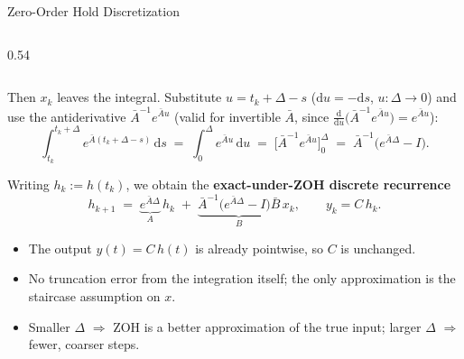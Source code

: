 \begin{frame}{Zero-Order Hold Discretization}
\begin{columns}[T]
\begin{column}{0.54\textwidth}
    \end{column}
  \end{columns}

  Then $x_k$ leaves the integral. Substitute $u = t_k + \Delta - s$ ($\mathrm{d}u = -\mathrm{d}s$, $u\colon \Delta \to 0$) and use the antiderivative $\bar{A}^{-1} e^{\bar{A} u}$ (valid for invertible $\bar{A}$, since $\tfrac{\mathrm{d}}{\mathrm{d}u}\bigl(\bar{A}^{-1} e^{\bar{A} u}\bigr) = e^{\bar{A} u}$):
  \[
    \int_{t_k}^{t_k+\Delta} e^{\bar{A}(t_k+\Delta-s)}\,\mathrm{d}s
    \;=\; \int_0^{\Delta} e^{\bar{A} u}\,\mathrm{d}u
    \;=\; \bigl[\bar{A}^{-1} e^{\bar{A} u}\bigr]_0^{\Delta}
    \;=\; \bar{A}^{-1}\bigl(e^{\bar{A}\Delta} - I\bigr).
  \]

  Writing $h_k := h(t_k)$, we obtain the \textbf{exact-under-ZOH discrete recurrence}
  \[
    h_{k+1} \;=\; \underbrace{e^{\bar{A}\Delta}}_{A}\, h_k
    \;+\; \underbrace{\bar{A}^{-1}\bigl(e^{\bar{A}\Delta} - I\bigr)\bar{B}}_{B}\, x_k,
    \qquad y_k = C\, h_k.
  \]

  \begin{itemize}
    \item The output $y(t) = C\,h(t)$ is already pointwise, so $C$ is unchanged.
    \item No truncation error from the integration itself; the only approximation is the staircase assumption on $x$.
    \item Smaller $\Delta$ $\Rightarrow$ ZOH is a better approximation of the true input; larger $\Delta$ $\Rightarrow$ fewer, coarser steps.
  \end{itemize}
\end{frame}

